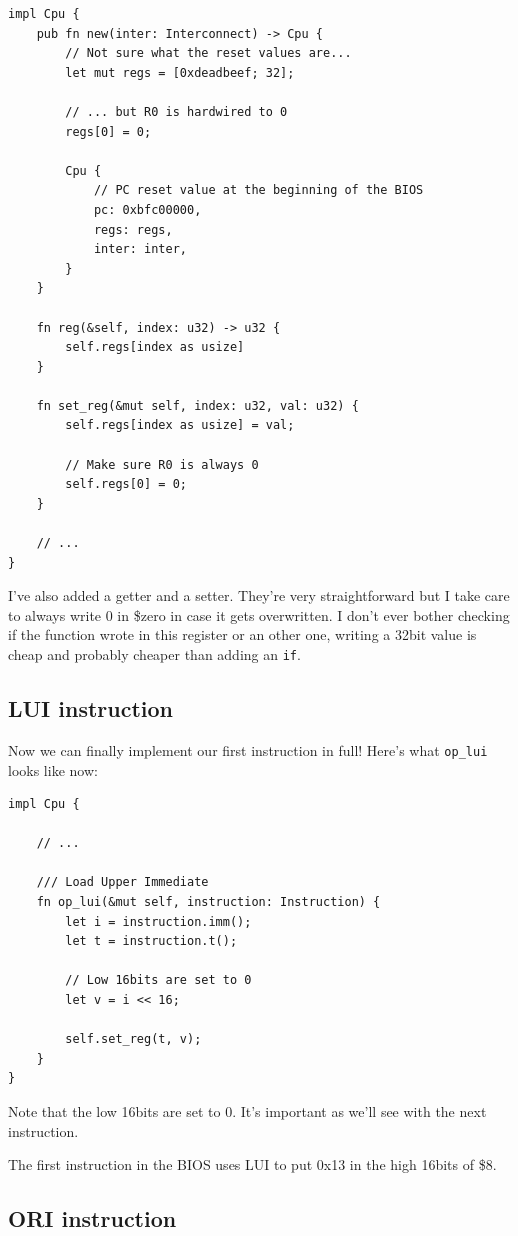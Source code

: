 \documentclass[a4paper]{article}
\newcommand{\code}[1] {\texttt{#1}}
\begin{document}
\begin{lstlisting}
impl Cpu {
    pub fn new(inter: Interconnect) -> Cpu {
        // Not sure what the reset values are...
        let mut regs = [0xdeadbeef; 32];

        // ... but R0 is hardwired to 0
        regs[0] = 0;

        Cpu {
            // PC reset value at the beginning of the BIOS
            pc: 0xbfc00000,
            regs: regs,
            inter: inter,
        }
    }

    fn reg(&self, index: u32) -> u32 {
        self.regs[index as usize]
    }

    fn set_reg(&mut self, index: u32, val: u32) {
        self.regs[index as usize] = val;

        // Make sure R0 is always 0
        self.regs[0] = 0;
    }

    // ...
}
\end{lstlisting}

I've also added a getter and a setter. They're very straightforward
but I take care to always write 0 in \$zero in case it gets
overwritten. I don't ever bother checking if the function wrote in
this register or an other one, writing a 32bit value is cheap and
probably cheaper than adding an \code{if}.

\subsection{LUI instruction}

Now we can finally implement our first instruction in full! Here's
what \code{op\_lui} looks like now:

\begin{lstlisting}
impl Cpu {

    // ...

    /// Load Upper Immediate
    fn op_lui(&mut self, instruction: Instruction) {
        let i = instruction.imm();
        let t = instruction.t();

        // Low 16bits are set to 0
        let v = i << 16;

        self.set_reg(t, v);
    }
}
\end{lstlisting}

Note that the low 16bits are set to 0. It's important as we'll see
with the next instruction.

The first instruction in the BIOS uses LUI to put 0x13 in the high
16bits of \$8.

\subsection{ORI instruction}
\end{document}
